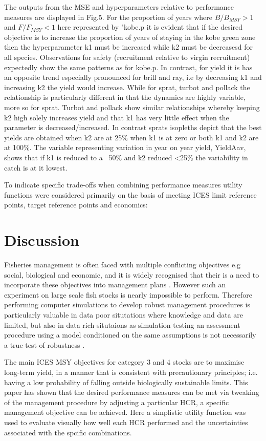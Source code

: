 \documentclass[preprint,review,12pt]{elsarticle}
\begin{document}
The outputs from the MSE and hyperparameters relative to performance measures are displayed in Fig.5. For the proportion of years where $B/B_{MSY} > 1$ and $F/F_{MSY} < 1$ here represented by "kobe.p it is evident that if the desired objective is to increase the proportion of years of staying in the kobe green zone then the hyperparameter k1 must be increased while k2 must be decreasesd for all species. Observations for safety (recruitment relative to virgin recruitment) expectedly show the same patterns as for kobe.p. In contrast, for yield it is has an opposite trend especially pronounced for brill and ray, i.e by decreasing k1 and increasing k2 the yield would increase. While for sprat, turbot and pollack the relationship is particularly different in that the dynamics are highly variable, more so for sprat.  Turbot and pollack show similar relationships whereby keeping k2 high solely increases yield and that k1 has very little effect when the parameter is decreased/increased. In contrast sprats isopleths depict that the best yields are obtained when k2 are at 25\% when k1 is at zero or both k1 and k2 are at 100\%. The variable representing variation in year on year yield, YieldAav, shows that if k1 is reduced to a ~50\% and k2  reduced <25\% the variability in catch is at it lowest. 

To indicate specific trade-offs when combining performance measures utility functions were considered primarily on the basis of meeting ICES limit reference points, target reference points and economics:  


\section{Discussion}

Fisheries management is often faced with multiple conflicting objectives e.g social, biological and economic, and it is widely recognised that their is a need to incorporate these objectives into management plans \cite{rindorf2017inclusion}. However such an experiment on large scale fish stocks is nearly impossible to perform.  Therefore performing computer simulations to develop robust management procedures is particularly valuable in data poor situtations where knowledge and data are limited, but also in data rich situtaions as simulation testing an assessment procedure using a model conditioned on the same assumptions is not necessarily a true test of robustness \cite{geromont2014generic}.  

The main ICES MSY objectives for category 3 and 4 stocks are to maximise long-term yield, in a manner that is consistent with precautionary principles; i.e. having a low probability of falling outside biologically sustainable limits.  This paper has shown that the desired performance measures can be met via tweaking of the management procedure by adjusting a particular HCR, a specific management objective can be achieved. Here a simplistic utility function was used to evaluate visually how well each HCR performed and the uncertainties associated with the spcific combinations.
\end{document}
